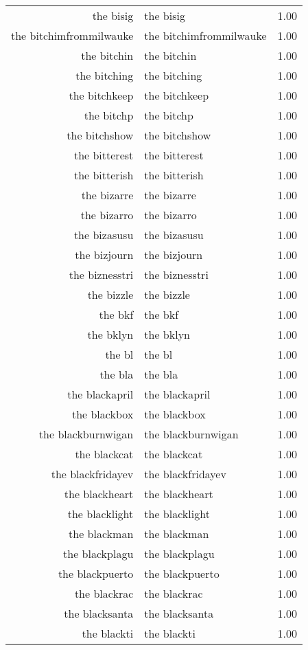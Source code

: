 \begin{table}[ht]
\begin{tabular}{rlr}
  the bisig & the bisig & 1.00 \\ 
  the bitchimfrommilwauke & the bitchimfrommilwauke & 1.00 \\ 
  the bitchin & the bitchin & 1.00 \\ 
  the bitching & the bitching & 1.00 \\ 
  the bitchkeep & the bitchkeep & 1.00 \\ 
  the bitchp & the bitchp & 1.00 \\ 
  the bitchshow & the bitchshow & 1.00 \\ 
  the bitterest & the bitterest & 1.00 \\ 
  the bitterish & the bitterish & 1.00 \\ 
  the bizarre & the bizarre & 1.00 \\ 
  the bizarro & the bizarro & 1.00 \\ 
  the bizasusu & the bizasusu & 1.00 \\ 
  the bizjourn & the bizjourn & 1.00 \\ 
  the biznesstri & the biznesstri & 1.00 \\ 
  the bizzle & the bizzle & 1.00 \\ 
  the bkf & the bkf & 1.00 \\ 
  the bklyn & the bklyn & 1.00 \\ 
  the bl & the bl & 1.00 \\ 
  the bla & the bla & 1.00 \\ 
  the blackapril & the blackapril & 1.00 \\ 
  the blackbox & the blackbox & 1.00 \\ 
  the blackburnwigan & the blackburnwigan & 1.00 \\ 
  the blackcat & the blackcat & 1.00 \\ 
  the blackfridayev & the blackfridayev & 1.00 \\ 
  the blackheart & the blackheart & 1.00 \\ 
  the blacklight & the blacklight & 1.00 \\ 
  the blackman & the blackman & 1.00 \\ 
  the blackplagu & the blackplagu & 1.00 \\ 
  the blackpuerto & the blackpuerto & 1.00 \\ 
  the blackrac & the blackrac & 1.00 \\ 
  the blacksanta & the blacksanta & 1.00 \\ 
  the blackti & the blackti & 1.00 \\ 

\end{tabular}
\end{table}
